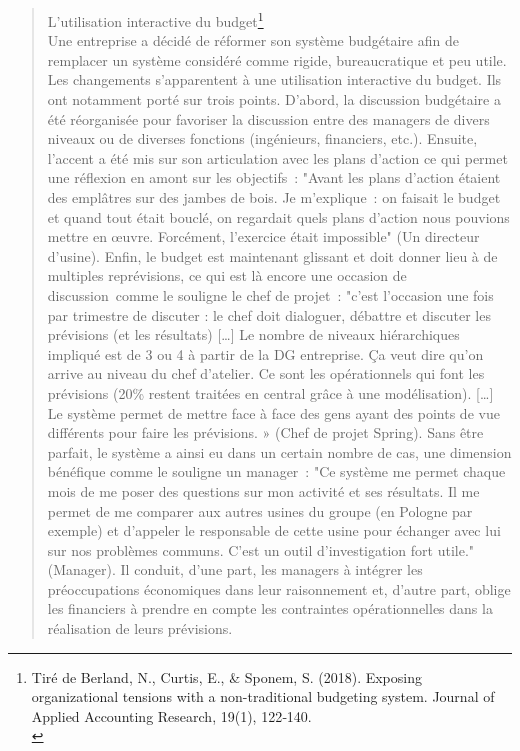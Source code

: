 \documentclass{tufte-handout}
\begin{document}
\begin{enumerate}
\begin{verse}
L'utilisation interactive du budget\footnote{Tiré de Berland, N., Curtis, E., \& Sponem, S. (2018). Exposing organizational tensions with a non-traditional budgeting system. Journal of Applied Accounting Research, 19(1), 122‑140.\\}\\
Une entreprise a décidé de réformer son système budgétaire afin de remplacer un système considéré comme rigide, bureaucratique et peu utile. Les changements s'apparentent à une utilisation interactive du budget. Ils ont notamment porté sur trois points. D'abord, la discussion budgétaire a été réorganisée pour favoriser la discussion entre des managers de divers niveaux ou de diverses fonctions (ingénieurs, financiers, etc.). Ensuite, l'accent a été mis sur son articulation avec les plans d'action ce qui permet une réflexion en amont sur les objectifs : "Avant les plans d'action étaient des emplâtres sur des jambes de bois. Je m'explique : on faisait le budget et quand tout était bouclé, on regardait quels plans d'action nous pouvions mettre en œuvre. Forcément, l'exercice était impossible" (Un directeur d'usine). Enfin, le budget est maintenant glissant et doit donner lieu à de multiples reprévisions, ce qui est là encore une occasion de discussion comme le souligne le chef de projet : "c'est l'occasion une fois par trimestre de discuter : le chef doit dialoguer, débattre et discuter les prévisions (et les résultats) [\ldots{}] Le nombre de niveaux hiérarchiques impliqué est de 3 ou 4 à partir de la DG entreprise. Ça veut dire qu'on arrive au niveau du chef d'atelier. Ce sont les opérationnels qui font les prévisions (20\% restent traitées en central grâce à une modélisation). [\ldots{}] Le système permet de mettre face à face des gens ayant des points de vue différents pour faire les prévisions. » (Chef de projet Spring). Sans être parfait, le système a ainsi eu dans un certain nombre de cas, une dimension bénéfique comme le souligne un manager : "Ce système me permet chaque mois de me poser des questions sur mon activité et ses résultats. Il me permet de me comparer aux autres usines du groupe (en Pologne par exemple) et d'appeler le responsable de cette usine pour échanger avec lui sur nos problèmes communs. C'est un outil d'investigation fort utile." (Manager). Il conduit, d'une part, les managers à intégrer les préoccupations économiques dans leur raisonnement et, d'autre part, oblige les financiers à prendre en compte les contraintes opérationnelles dans la réalisation de leurs prévisions.\\
\end{verse}


\end{enumerate}
\end{document}

